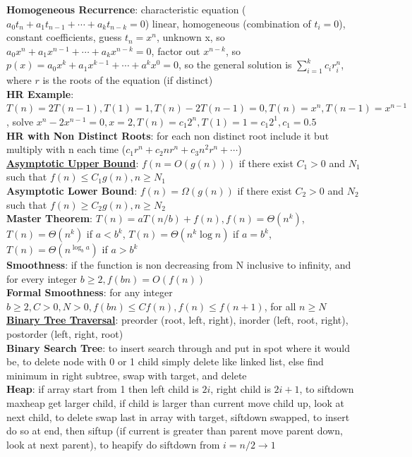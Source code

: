 \documentclass[a4paper]{article}
\begin{document}
\begin{multicols}{2}
        \textbf{Homogeneous Recurrence}: characteristic equation ($a_0t_n + a_1t_{n-1} + \cdots + a_k t_{n-k} = 0$) linear, homogeneous (combination of $t_i = 0$), constant coefficients, guess $t_n = x^n$, unknown x, so $a_0x^n + a_1x^{n-1} + \cdots + a_k x^{n-k} = 0$, factor out $x^{n-k}$, so $p(x) = a_0x^k + a_1x^{k-1} + \cdots + a^k x^0 = 0$, so the general solution is $\sum\nolimits_{i=1}^k c_i r_i^n$, where $r$ is the roots of the equation (if distinct)\\
        \textbf{HR Example}: $T(n) = 2T(n-1), T(1) = 1, T(n) - 2T(n-1) = 0, T(n) = x^n, T(n-1) = x^{n-1}$, solve $x^n-2x^{n-1} = 0, x = 2, T(n) = c_1 2^n, T(1) = 1 = c_1 2^1, c_1 = 0.5$\\
        \textbf{HR with Non Distinct Roots}: for each non distinct root include it but multiply with n each time ($c_1r^n+c_2nr^n+c_3n^2r^n+\cdots$)\\
        \underline{\textbf{Asymptotic Upper Bound}}: $f(n = O(g(n)))$ if there exist $C_1 > 0$ and $N_1$ such that $f(n) \leq C_1g(n), n \geq N_1$\\
        \textbf{Asymptotic Lower Bound}: $f(n) = \Omega (g(n))$ if there exist $C_2 > 0$ and $N_2$ such that $f(n) \geq C_2g(n), n \geq N_2$\\
        \textbf{Master Theorem}: $T(n) = aT(n/b)+f(n), f(n) = \Theta (n^k)$, $T(n) = \Theta (n^k)$ if $a < b^k$, $T(n) = \Theta (n^k \log n)$ if $a = b^k$, $T(n) = \Theta (n^{\log_b a})$ if $a > b^k$\\
        \textbf{Smoothness}: if the function is non decreasing from N inclusive to infinity, and for every integer $b \geq 2, f(bn) = O(f(n))$\\
        \textbf{Formal Smoothness}: for any integer $b \geq 2, C > 0, N > 0, f(bn) \leq Cf(n), f(n) \leq f(n+1)$, for all $n \geq N$\\
        \underline{\textbf{Binary Tree Traversal}}: preorder (root, left, right), inorder (left, root, right), postorder (left, right, root)\\
        \textbf{Binary Search Tree}: to insert search through and put in spot where it would be, to delete node with 0 or 1 child simply delete like linked list, else find minimum in right subtree, swap with target, and delete\\
        \textbf{Heap}: if array start from 1 then left child is $2i$, right child is $2i+1$, to siftdown maxheap get larger child, if child is larger than current move child up, look at next child, to delete swap last in array with target, siftdown swapped, to insert do so at end, then siftup (if current is greater than parent move parent down, look at next parent), to heapify do siftdown from $i = n/2 \to 1$\\

\end{multicols}
\end{document}
